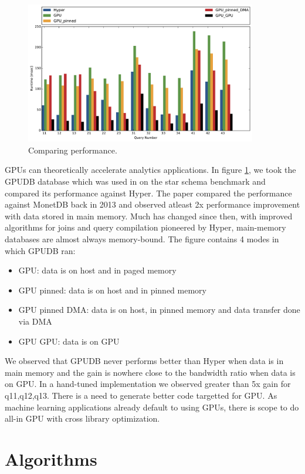 \documentclass[11pt,twoside,a4paper]{article}
\begin{document}
\begin{figure}[!h]
  \centering
    \includegraphics[width=0.9\textwidth]{runtimes.pdf}
  \caption{Comparing performance.}
  \label{fig:runtimes}
\end{figure}

GPUs can theoretically accelerate analytics applications. In figure
\ref{fig:runtimes}, we took the GPUDB database which was used in
\cite{gpudb,gpudb2} on the star schema benchmark and compared its performance
against Hyper. The paper compared the performance against MonetDB back in 2013
and observed atleast 2x performance improvement with data stored in main memory.
Much has changed since then, with improved algorithms for joins and query
compilation pioneered by Hyper, main-memory databases are almost always
memory-bound. The figure contains 4 modes in which GPUDB ran:
\begin{itemize}
\item GPU: data is on host and in paged memory
\item GPU pinned: data is on host and in pinned memory
\item GPU pinned DMA: data is on host, in pinned memory and data transfer done
via DMA
\item GPU GPU: data is on GPU 
\end{itemize}
We observed that GPUDB never performs better than Hyper when data is in main
memory and the gain is nowhere close to the bandwidth ratio when data is on GPU.
In a hand-tuned implementation we observed greater than 5x gain for q11,q12,q13.
There is a need to generate better code targetted for GPU. As machine learning
applications already default to using GPUs, there is scope to do all-in GPU with
cross library optimization.

\section{Algorithms}
\end{document}
